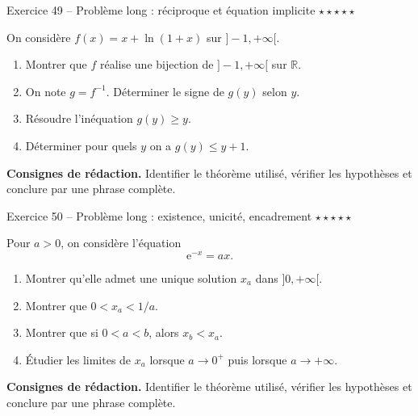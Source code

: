 \documentclass[11pt,a4paper]{article}
\newcommand{\etoiles}[1]{\hfill\textcolor{orangeprepa}{\textbf{#1}}}
\newcommand{\R}{\mathbb{R}}
\newcommand{\e}{\mathrm{e}}
\begin{document}
\begin{exobox}{Exercice 49 -- Problème long : réciproque et équation implicite \etoiles{$\star\star\star\star\star$}}

On considère $f(x)=x+\ln(1+x)$ sur $]-1,+\infty[$.
\begin{enumerate}
\item Montrer que $f$ réalise une bijection de $]-1,+\infty[$ sur $\R$.
\item On note $g=f^{-1}$. Déterminer le signe de $g(y)$ selon $y$.
\item Résoudre l'inéquation $g(y)\geq y$.
\item Déterminer pour quels $y$ on a $g(y)\leq y+1$.
\end{enumerate}

\medskip
\textbf{Consignes de rédaction.} Identifier le théorème utilisé, vérifier les hypothèses et conclure par une phrase complète.
\end{exobox}


\begin{exobox}{Exercice 50 -- Problème long : existence, unicité, encadrement \etoiles{$\star\star\star\star\star$}}

Pour $a>0$, on considère l'équation
\[
\e^{-x}=ax.
\]
\begin{enumerate}
\item Montrer qu'elle admet une unique solution $x_a$ dans $]0,+\infty[$.
\item Montrer que $0<x_a<1/a$.
\item Montrer que si $0<a<b$, alors $x_b<x_a$.
\item Étudier les limites de $x_a$ lorsque $a\to0^+$ puis lorsque $a\to+\infty$.
\end{enumerate}

\medskip
\textbf{Consignes de rédaction.} Identifier le théorème utilisé, vérifier les hypothèses et conclure par une phrase complète.
\end{exobox}
\end{document}
